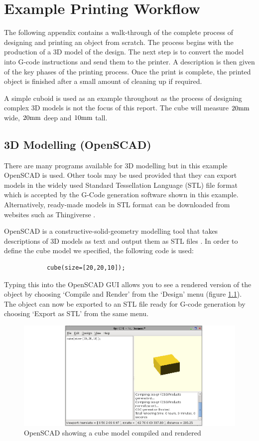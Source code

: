 \chapter{Example Printing Workflow}
	
	\label{sec:workflow}
	
	The following appendix contains a walk-through of the complete process of
	designing and printing an object from scratch. The process begins with the
	production of a 3D model of the design. The next step is to convert the model
	into G-code instructions and send them to the printer. A description is then
	given of the key phases of the printing process. Once the print is complete,
	the printed object is finished after a small amount of cleaning up if
	required.
	
	A simple cuboid is used as an example throughout as the process of designing
	complex 3D models is not the focus of this report. The cube will measure
	$20\textrm{mm}$ wide, $20\textrm{mm}$ deep and $10\textrm{mm}$ tall.
	
	\section{3D Modelling (OpenSCAD)}
		
		There are many programs available for 3D modelling but in this example
		OpenSCAD is used. Other tools may be used provided that they can export
		models in the widely used Standard Tessellation Language (STL) file format
		which is accepted by the G-Code generation software shown in this example.
		Alternatively, ready-made models in STL format can be downloaded from
		websites such as Thingiverse \cite{thingiverse}.
		
		OpenSCAD is a constructive-solid-geometry modelling tool that takes
		descriptions of 3D models as text and output them as STL files
		\cite{openscad}. In order to define the cube model we specified, the
		following code is used:
		\begin{verbatim}
			cube(size=[20,20,10]);
		\end{verbatim}
		Typing this into the OpenSCAD GUI allows you to see a rendered version of
		the object by choosing `Compile and Render' from the `Design' menu (figure
		\ref{fig:openSCAD}).  The
		object can now be exported to an STL file ready for G-code generation by
		choosing `Export as STL' from the same menu.
		
		\begin{figure}
			\includegraphics[width=1\textwidth]{diagrams/openSCAD.pdf}
			\caption{OpenSCAD showing a cube model compiled and rendered}
			\label{fig:openSCAD}
		\end{figure}
		
